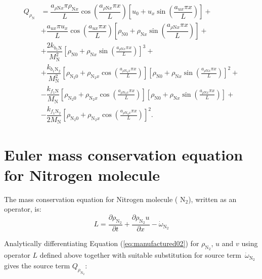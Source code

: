 \documentclass[10pt]{article}
\newcommand{\diff}[2] {\dfrac{\partial #1 }{\partial #2}}
\begin{document}
\begin{equation}
\begin{split}
Q_{\rho_\text{N}} &= \dfrac{a_{ \rho \text{N} x } \pi \rho_{\text{N}x} }{L} \cos\left( \dfrac{a_{ \rho \text{N} x } \pi x}{L}\right) \left[u_0+u_x \sin\left( \dfrac{a_{ux} \pi x}{L}\right)\right] + \\
&+ \dfrac{ a_{ux} \pi u_x}{L}\cos\left( \dfrac{a_{ux} \pi x}{L}\right) \left[\rho_{\text{N}0}+\rho_{\text{N}x} \sin\left( \dfrac{a_{ \rho \text{N} x } \pi x}{L}\right)\right] + \\
&+ \dfrac{ 2 k_{b_1 \text{N}}}{M_{\text{N}}^2} \left[\rho_{\text{N}0} + \rho_{\text{N}x} \sin\left(\frac{a_{ \rho \text{N} x} \pi x}{L}\right)\right]^3 +\\
& + \dfrac{ k_{b_1 \text{N}_2}}{M_{\text{N}}^2} \left[\rho_{\text{N}_2 0}+ \rho_{\text{N}_2 x} \cos\left(\frac{a_{ \rho \text{N}_2 x} \pi x}{L}\right)\right] \left[\rho_{\text{N}0} + \rho_{\text{N}x} \sin\left(\frac{a_{ \rho \text{N} x} \pi x}{L}\right)\right]^2 +\\
&- \dfrac{ k_{f_1 \text{N}} }{M_{\text{N}}} \left[\rho_{\text{N}_2 0}+ \rho_{\text{N}_2 x} \cos\left(\frac{a_{ \rho \text{N}_2 x} \pi x}{L}\right)\right] \left[\rho_{\text{N}0} + \rho_{\text{N}x} \sin\left(\frac{a_{ \rho \text{N} x} \pi x}{L}\right)\right]+\\
&- \dfrac{k_{f_1 \text{N}_2} }{2 M_{\text{N}}} \left[\rho_{\text{N}_2 0}+ \rho_{\text{N}_2 x} \cos\left(\frac{a_{ \rho \text{N}_2 x} \pi x}{L}\right)\right]^2.
\end{split}
\end{equation}


\section{Euler mass conservation equation for Nitrogen molecule}

The mass conservation equation for Nitrogen molecule ( $\text{N}_2$), written as an operator, is:
\begin{equation}
 \label{eq:euler1d_11a}
L= \diff{\rho_{\text{N}_2}}{t} + \diff{\rho_{\text{N}_2} u }{x} - \dot{\omega}_{\text{N}_2}
\end{equation}

Analytically differentiating Equation (\ref{eq:manufactured02}) for $\rho_{\text{N}_2}$, $u$ and $v$ using operator $L$ defined above together with suitable substitution for source term~$\dot{\omega}_{\text{N}_2}$ gives the source term $Q_{\rho_{\text{N}_2}}$:
\end{document}
